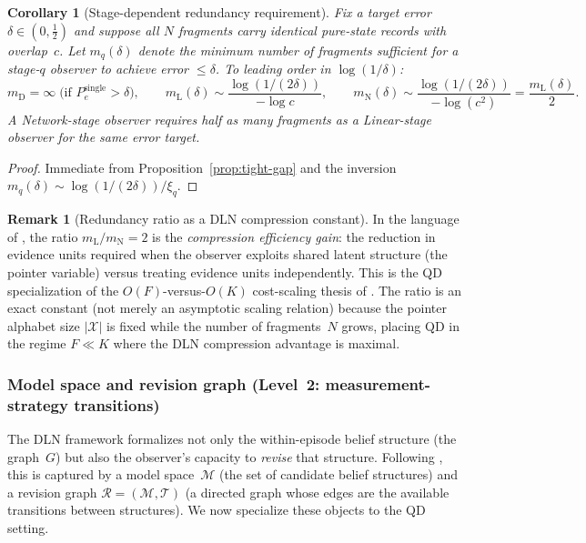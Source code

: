 \documentclass[11pt]{article}
\newcommand{\cX}{\mathcal{X}}
\newcommand{\1}{\mathbf{1}}
\theoremstyle{definition}
\newtheorem{remark}{Remark}
\theoremstyle{plain}
\newtheorem{corollary}{Corollary}
\begin{document}
\begin{corollary}[Stage-dependent redundancy requirement]
\label{cor:redundancy-stages}
Fix a target error $\delta\in(0,\tfrac12)$ and suppose all $N$ fragments
carry identical pure-state records with overlap~$c$.
Let $m_q(\delta)$ denote the minimum number of fragments sufficient for
a stage-$q$ observer to achieve error $\le\delta$.
To leading order in $\log(1/\delta)$:
\[
  m_{\mathrm{D}}=\infty\;\text{(if $P_e^{\mathrm{single}}>\delta$)},
  \qquad
  m_{\mathrm{L}}(\delta) \sim \frac{\log(1/(2\delta))}{-\log c},
  \qquad
  m_{\mathrm{N}}(\delta) \sim \frac{\log(1/(2\delta))}{-\log(c^2)}
  = \frac{m_{\mathrm{L}}(\delta)}{2}.
\]
A Network-stage observer requires half as many fragments as a
Linear-stage observer for the same error target.
\end{corollary}

\begin{proof}
Immediate from Proposition~\ref{prop:tight-gap} and the inversion
$m_q(\delta) \sim \log(1/(2\delta)) / \xi_q$.
\end{proof}


\begin{remark}[Redundancy ratio as a DLN compression constant]
\label{rem:compression}
In the language of \citep{WuDLNCompression2026preprint}, the ratio
$m_{\mathrm{L}}/m_{\mathrm{N}}=2$ is the \emph{compression efficiency
gain}: the reduction in evidence units required when the observer
exploits shared latent structure (the pointer variable) versus treating
evidence units independently.
This is the QD specialization of the $O(F)$-versus-$O(K)$ cost-scaling
thesis of \citep[Proposition~1(i)]{WuDLNCompression2026preprint}.
The ratio is an exact constant (not merely an asymptotic scaling
relation) because the pointer alphabet size $|\cX|$ is fixed while the
number of fragments~$N$ grows, placing QD in the regime $F\ll K$ where
the DLN compression advantage is maximal.
\end{remark}


\subsubsection{Model space and revision graph
              (Level~2: measurement-strategy transitions)}
\label{sec:revision-qd}

The DLN framework formalizes not only the within-episode belief structure
(the graph~$G$) but also the observer's capacity to \emph{revise} that
structure.
Following \citep[Sec.~2.3]{WuDLNCompression2026preprint}, this is
captured by a model space~$\mathcal{M}$ (the set of candidate belief
structures) and a revision graph $\mathcal{R}=(\mathcal{M},\mathcal{T})$
(a directed graph whose edges are the available transitions between
structures).
We now specialize these objects to the QD setting.
\end{document}

